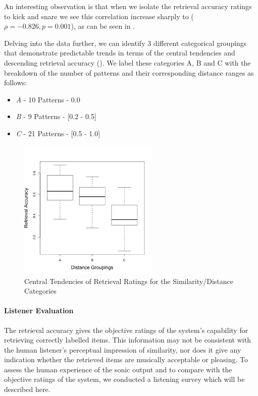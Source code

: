 An interesting observation is that when we isolate the retrieval accuracy ratings to kick and snare we see this correlation increase sharply to ($\rho = -0.826, p = 0.001$), as can be seen in .

Delving into the data further, we can identify 3 different categorical groupings that demonstrate predictable trends in terms of the central tendencies and descending retrieval accuracy (). We label these categories A, B and C with the breakdown of the number of patterns and their corresponding distance ranges as follows:

\begin{itemize}
  \item \textit{A} - 10 Patterns - 0.0
  \item \textit{B} - 9 Patterns - [0.2 - 0.5]
  \item \textit{C} - 21 Patterns - [0.5 - 1.0]
\end{itemize}

\begin{figure}
	\begin{center}
		\includegraphics[width=0.6\textwidth]{ch07_evaluation/figures/new_retrieval_plot.png}
	\end{center}
	\caption[Central Tendencies of Retrieval Ratings for the Similarity/Distance Categories
]{Central Tendencies of Retrieval Ratings for the Similarity/Distance Categories}
	\label{fig:central_tendencies}
\end{figure}

\paragraph{Listener Evaluation}

The retrieval accuracy gives the objective ratings of the system’s capability for retrieving correctly labelled items. This information may not be consistent with the human listener’s perceptual impression of similarity, nor does it give any indication whether the retrieved items are musically acceptable or pleasing. To assess the human experience of the sonic output and to compare with the objective ratings of the system, we conducted a listening survey which will be described here.

